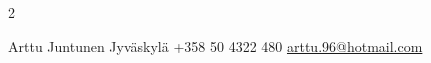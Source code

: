 \documentclass[lighthipster]{simplehipstercv}
\newlength{\rightcolwidth}
\begin{document}
\begin{paracol}{2}
\vfill{} %

\setlength{\parindent}{0pt}
\begin{minipage}[t]{\rightcolwidth}
\begin{center}\fontfamily{\sfdefault}\selectfont \color{black!70}
{\small Arttu Juntunen  Jyväskylä  +358 50 4322 480  \protect\url{arttu.96@hotmail.com}
}
\end{center}
\end{minipage}

\end{paracol}
\end{document}
